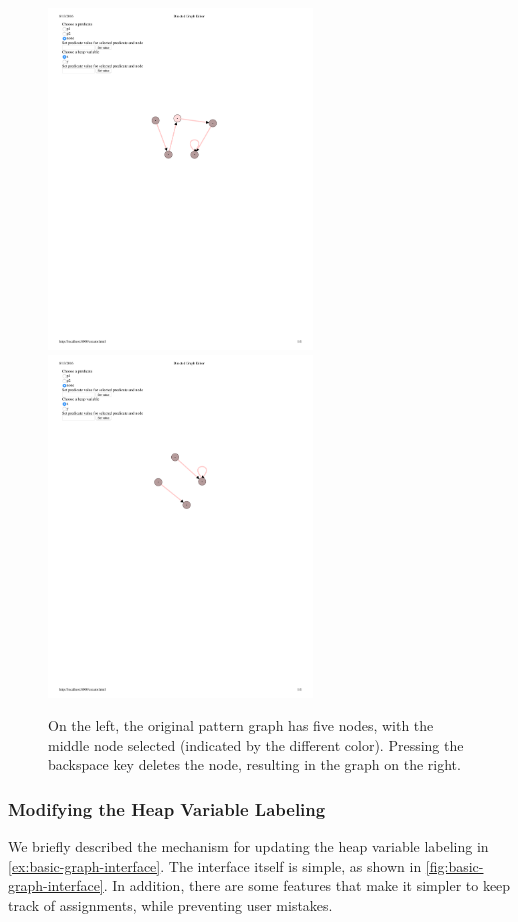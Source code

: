 \begin{figure}
  \centering
  \includegraphics[width=7cm]{fig/nodes-original.pdf}
  \includegraphics[width=7cm]{fig/nodes-changed.pdf}
  \caption{On the left, the original pattern graph has five nodes, with the middle node selected (indicated by the different color). Pressing the backspace key deletes the node, resulting in the graph on the right.
  }
  \label{fig:modifying-nodes}
\end{figure}

\subsubsection{Modifying the Heap Variable Labeling}
We briefly described the mechanism for updating the heap variable labeling in
\autoref{ex:basic-graph-interface}. The interface itself is simple, as shown in
\autoref{fig:basic-graph-interface}. In addition, there are some features that make it
simpler to keep track of assignments, while preventing user mistakes.

